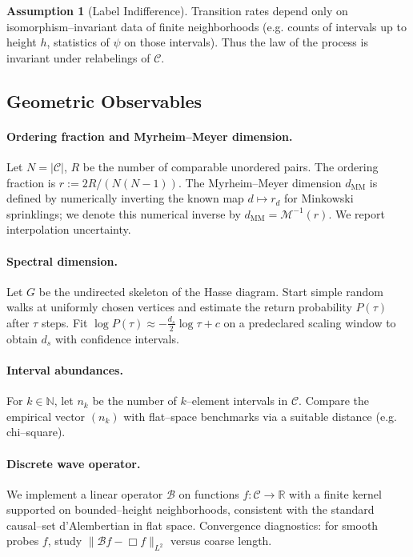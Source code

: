 \documentclass[12pt]{article}
\theoremstyle{definition}
\newtheorem{assumption}[theorem]{Assumption}
\newcommand{\C}{\mathcal{C}}
\newcommand{\N}{\mathbb{N}}
\newcommand{\R}{\mathbb{R}}
\newcommand{\Ps}{\psi}
\newcommand{\Boxd}{\mathcal{B}} %
\begin{document}
\begin{assumption}[Label Indifference]\label{ass:cov}
Transition rates depend only on isomorphism--invariant data of finite neighborhoods (e.g. counts of intervals up to height \(h\), statistics of \(\Ps\) on those intervals). Thus the law of the process is invariant under relabelings of \(\C\).
\end{assumption}

\subsection{Geometric Observables}
\paragraph{Ordering fraction and Myrheim--Meyer dimension.} Let \(N=|\C|\), \(R\) be the number of comparable unordered pairs. The ordering fraction is \(r:=2R/(N(N-1))\). The Myrheim--Meyer dimension \(d_{\mathrm{MM}}\) is defined by numerically inverting the known map \(d\mapsto r_d\) for Minkowski sprinklings; we denote this numerical inverse by \(d_{\mathrm{MM}}=\mathcal{M}^{-1}(r)\). We report interpolation uncertainty.

\paragraph{Spectral dimension.} Let \(G\) be the undirected skeleton of the Hasse diagram. Start simple random walks at uniformly chosen vertices and estimate the return probability \(P(\tau)\) after \(\tau\) steps. Fit \(\log P(\tau)\approx -\tfrac{d_s}{2}\log\tau + c\) on a predeclared scaling window to obtain \(d_s\) with confidence intervals.

\paragraph{Interval abundances.} For \(k\in\N\), let \(n_k\) be the number of \(k\)--element intervals in \(\C\). Compare the empirical vector \((n_k)\) with flat--space benchmarks via a suitable distance (e.g. chi--square).

\paragraph{Discrete wave operator.} We implement a linear operator \(\Boxd\) on functions \(f: \C\to\R\) with a finite kernel supported on bounded--height neighborhoods, consistent with the standard causal--set d'Alembertian in flat space. Convergence diagnostics: for smooth probes \(f\), study \(\|\Boxd f - \Box f\|_{L^2}\) versus coarse length.
\end{document}

